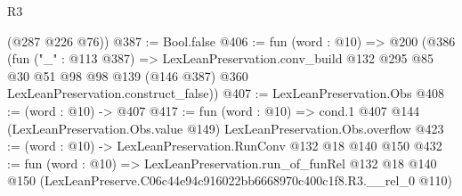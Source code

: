 \begin{lexlean}{R3}
\begin{coremodule}
      (@287 @226 @76))
@387 := Bool.false
@406 := fun (word : @10) =>
  @200
    (@386
      (fun ("_" : @113 @387) =>
      LexLeanPreservation.conv_build
        @132
        @295
        @85
        @30
        @51
        @98
        @98
        @139
        (@146 @387)
        @360
        LexLeanPreservation.construct_false))
@407 := LexLeanPreservation.Obs
@408 := (word : @10) -> @407
@417 := fun (word : @10) =>
  cond.{1} @407 @144 (LexLeanPreservation.Obs.value @149) LexLeanPreservation.Obs.overflow
@423 := (word : @10) -> LexLeanPreservation.RunConv @132 @18 @140 @150
@432 := fun (word : @10) =>
  LexLeanPreservation.run_of_funRel
    @132
    @18
    @140
    @150
    (LexLeanPreserve.C06c44e94c916022bb6668970c400c1f8.R3.__rel_0 @110)
\end{coremodule}
\end{lexlean}
